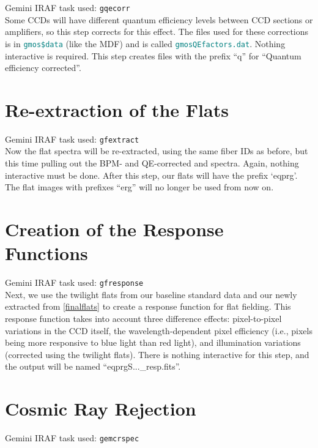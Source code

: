 \documentclass[12pt]{report}
\newcommand{\ty}[1]{\textcolor{teal}{\texttt{#1}}}
\begin{document}
\noindent Gemini IRAF task used: \texttt{gqecorr}\\

\noindent Some CCDs will have different quantum efficiency levels between CCD sections or amplifiers, so this step corrects for this effect. The files used for these corrections is in \ty{gmos\$data} (like the MDF) and is called \ty{gmosQEfactors.dat}. Nothing interactive is required. This step creates files with the prefix ``q'' for ``Quantum efficiency corrected''.

\bigskip
\section{Re-extraction of the Flats}
\label{finalflats}
\noindent Gemini IRAF task used: \texttt{gfextract}\\

\noindent Now the flat spectra will be re-extracted, using the same fiber IDs as before, but this time pulling out the BPM- and QE-corrected and spectra. Again, nothing interactive must be done. After this step, our flats will have the prefix `eqprg'. The flat images with prefixes ``erg'' will no longer be used from now on.

\bigskip
\section{Creation of the Response Functions}

\noindent Gemini IRAF task used: \texttt{gfresponse}\\

\noindent Next, we use the twilight flats from our baseline standard data and our newly extracted from \autoref{finalflats} to create a response function for flat fielding. This response function takes into account three difference effects: pixel-to-pixel variations in the CCD itself, the wavelength-dependent pixel efficiency (i.e., pixels being more responsive to blue light than red light), and  illumination variations (corrected using the twilight flats). There is nothing interactive for this step, and the output will be named ``eqprgS...\_resp.fits''.

\bigskip
\section{Cosmic Ray Rejection}

\noindent Gemini IRAF task used: \texttt{gemcrspec}\\
\end{document}
